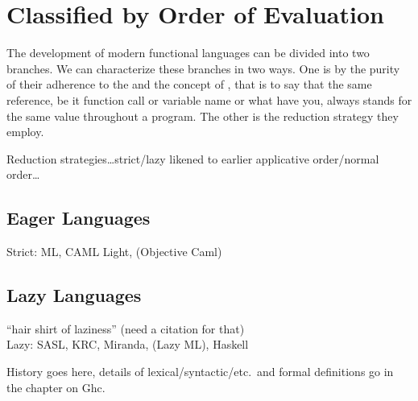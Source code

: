 \section{Classified by Order of Evaluation}
The development of modern functional languages can be divided into two branches. We can characterize these branches in two ways. One is by the purity of their adherence to the \lambdacalc and the concept of , that is to say that the same reference, be it function call or variable name or what have you, always stands for the same value throughout a program. The other is the reduction strategy they employ.

Reduction strategies\dots strict/lazy likened to earlier applicative order/normal order\dots

\subsection{Eager Languages}
Strict: ML, CAML Light, (Objective Caml)

\subsection{Lazy Languages}
``hair shirt of laziness'' (need a citation for that)\\
Lazy: SASL, KRC, Miranda, (Lazy ML), Haskell

History goes here, details of lexical/syntactic/etc.~and formal definitions go in the chapter on Ghc.

